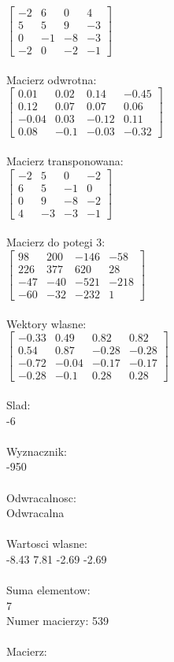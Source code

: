 \documentclass[a4paper,12pt]{article}
\begin{document}
$\begin{bmatrix} -2&6&0&4\\5&5&9&-3\\0&-1&-8&-3\\-2&0&-2&-1 \end{bmatrix}$
\\
\\
Macierz odwrotna:\\

$\begin{bmatrix} 0.01&0.02&0.14&-0.45\\0.12&0.07&0.07&0.06\\-0.04&0.03&-0.12&0.11\\0.08&-0.1&-0.03&-0.32 \end{bmatrix}$
\\
\\
Macierz transponowana:\\

$\begin{bmatrix} -2&5&0&-2\\6&5&-1&0\\0&9&-8&-2\\4&-3&-3&-1 \end{bmatrix}$
\\
\\
Macierz do potegi 3:\\

$\begin{bmatrix} 98&200&-146&-58\\226&377&620&28\\-47&-40&-521&-218\\-60&-32&-232&1 \end{bmatrix}$
\\
\\
Wektory wlasne:\\

$\begin{bmatrix} -0.33&0.49&0.82&0.82\\0.54&0.87&-0.28&-0.28\\-0.72&-0.04&-0.17&-0.17\\-0.28&-0.1&0.28&0.28 \end{bmatrix}$
\\
\\
Slad:\\
-6
\\
\\
Wyznacznik:\\
-950
\\
\\
Odwracalnosc:\\
Odwracalna
\\
\\
Wartosci wlasne:\\
-8.43 7.81 -2.69 -2.69
\\
\\
Suma elementow:\\
7
\\
\newpage
Numer macierzy:
539
\\
\\
Macierz:\\
\end{document}
